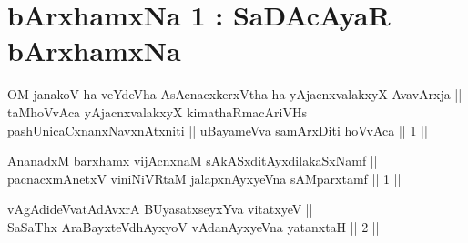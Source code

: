 
\chapter{bArxhamxNa 1 : SaDAcAyaR bArxhamxNa}


\begin{kandikeshl}
OM janakoV ha veYdeVha AsAcnacxkerxV\s tha ha yAjacnxvalakxyX AvavArxja || taMhoVvAca yAjacnxvalakxyX kimathaRmacAriVHs pashUnicaCxnanxNavxnAtxniti || uBayameVva samArxDiti hoVvAca || 1 ||
\end{kandikeshl}


\begin{shl}
AnanadxM barxhamx vijAcnxnaM sAkASxditAyxdilakaSxNamf || \\
pacnacxmAnetxV viniNiVRtaM jalapxnAyxyeVna sAMparxtamf \hfill || 1 ||  
\end{shl}
				
\begin{shl}
vAgAdideVvatAdAvxrA BUyasatxseyxYva vitatxyeV || \\
SaSaThx AraBayxteV\s dhAyxyoV vAdanAyxyeVna yatanxtaH \hfill ||  2 ||  
\end{shl}

